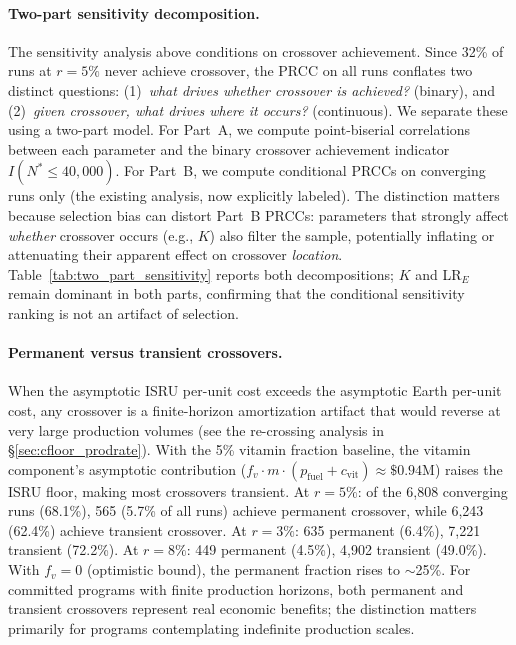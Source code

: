 \documentclass[preprint,12pt]{elsarticle}
\begin{document}
\paragraph{Two-part sensitivity decomposition.} The sensitivity analysis above conditions on crossover achievement. Since 32\% of runs at $r = 5\%$ never achieve crossover, the PRCC on all runs conflates two distinct questions: (1)~\emph{what drives whether crossover is achieved?} (binary), and (2)~\emph{given crossover, what drives where it occurs?} (continuous). We separate these using a two-part model. For Part~A, we compute point-biserial correlations between each parameter and the binary crossover achievement indicator $I(N^* \leq 40{,}000)$. For Part~B, we compute conditional PRCCs on converging runs only (the existing analysis, now explicitly labeled). The distinction matters because selection bias can distort Part~B PRCCs: parameters that strongly affect \emph{whether} crossover occurs (e.g., $K$) also filter the sample, potentially inflating or attenuating their apparent effect on crossover \emph{location}. Table~\ref{tab:two_part_sensitivity} reports both decompositions; $K$ and LR$_E$ remain dominant in both parts, confirming that the conditional sensitivity ranking is not an artifact of selection.

\paragraph{Permanent versus transient crossovers.} When the asymptotic ISRU per-unit cost exceeds the asymptotic Earth per-unit cost, any crossover is a finite-horizon amortization artifact that would reverse at very large production volumes (see the re-crossing analysis in \S\ref{sec:cfloor_prodrate}). With the 5\% vitamin fraction baseline, the vitamin component's asymptotic contribution ($f_v \cdot m \cdot (p_{\mathrm{fuel}} + c_{\mathrm{vit}}) \approx \$0.94$M) raises the ISRU floor, making most crossovers transient. At $r = 5\%$: of the 6{,}808 converging runs (68.1\%), 565 (5.7\% of all runs) achieve permanent crossover, while 6{,}243 (62.4\%) achieve transient crossover. At $r = 3\%$: 635 permanent (6.4\%), 7{,}221 transient (72.2\%). At $r = 8\%$: 449 permanent (4.5\%), 4{,}902 transient (49.0\%). With $f_v = 0$ (optimistic bound), the permanent fraction rises to $\sim$25\%. For committed programs with finite production horizons, both permanent and transient crossovers represent real economic benefits; the distinction matters primarily for programs contemplating indefinite production scales.
\end{document}
